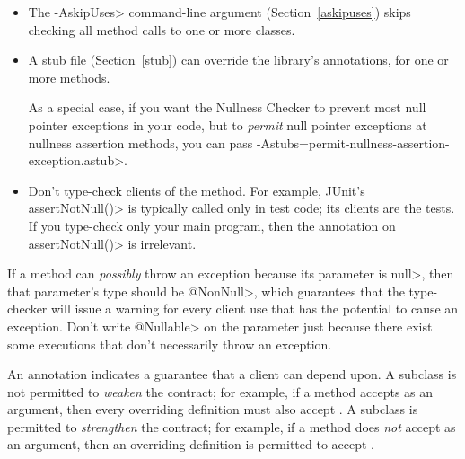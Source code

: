 \begin{itemize}
\item
  The \<-AskipUses> command-line argument (Section~\ref{askipuses}) skips
  checking all method calls to one or more classes.
\item
  A stub file (Section~\ref{stub}) can override the library's annotations,
  for one or more methods.

  As a special case, if you want the Nullness Checker to prevent most null
  pointer exceptions in your code, but to \emph{permit} null pointer
  exceptions at nullness assertion methods, you can pass
  \<-Astubs=permit-nullness-assertion-exception.astub>.
\item
  Don't type-check clients of the method.  For example, JUnit's
  \<assertNotNull()> is typically called only in test code; its clients are
  the tests.  If you type-check only your main program, then the annotation
  on \<assertNotNull()> is irrelevant.
\end{itemize}



If a method can \emph{possibly} throw an exception because its parameter
is \<null>, then that parameter's type should be \<@NonNull>, which
guarantees that the type-checker will issue a warning for every client
use that has the potential to cause an exception.  Don't write
\<@Nullable> on the parameter just because there exist some executions that
don't necessarily throw an exception.




An annotation indicates a guarantee that a client can depend upon.  A subclass
is not permitted to \emph{weaken} the contract; for example,
if a method accepts  as an argument, then every overriding
definition must also accept .
A subclass is permitted to \emph{strengthen} the contract; for example,
if a method does \emph{not} accept  as an argument, then an
overriding definition is permitted to accept .

